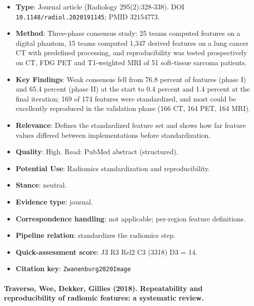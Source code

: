 \documentclass[journal,onecolumn]{IEEEtran}
\begin{document}
\begin{itemize}

\item{} \textbf{Type}: Journal article (Radiology 295(2):328-338). DOI \nolinkurl{10.1148/radiol.2020191145}; PMID 32154773.

\item{} \textbf{Method}: Three-phase consensus study: 25 teams computed features on a digital phantom, 15 teams computed 1,347 derived features on a lung cancer CT with predefined processing, and reproducibility was tested prospectively on CT, FDG PET and T1-weighted MRI of 51 soft-tissue sarcoma patients.

\item{} \textbf{Key Findings}: Weak consensus fell from 76.8 percent of features (phase I) and 65.4 percent (phase II) at the start to 0.4 percent and 1.4 percent at the final iteration; 169 of 174 features were standardized, and most could be excellently reproduced in the validation phase (166 CT, 164 PET, 164 MRI).

\item{} \textbf{Relevance}: Defines the standardized feature set and shows how far feature values differed between implementations before standardization.

\item{} \textbf{Quality}: High. Read: PubMed abstract (structured).

\item{} \textbf{Potential Use}: Radiomics standardization and reproducibility.

\item{} \textbf{Stance}: neutral.

\item{} \textbf{Evidence type}: journal.

\item{} \textbf{Correspondence handling}: not applicable; per-region feature definitions.

\item{} \textbf{Pipeline relation}: standardizes the radiomics step.

\item{} \textbf{Quick-assessment score}: J3 R3 Rel2 C3 (3318) D3 = 14.

\item{} \textbf{Citation key}: \texttt{Zwanenburg2020Image}

\end{itemize}

\paragraph{Traverso, Wee, Dekker, Gillies (2018). Repeatability and reproducibility of radiomic features: a systematic review.~\cite{Traverso2018Repeatability}}\mbox{}
\end{document}
